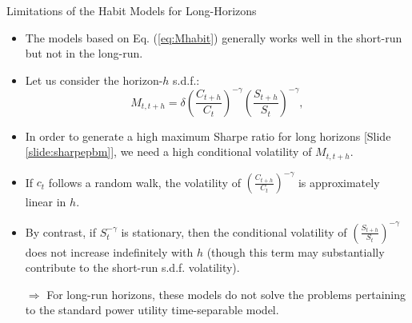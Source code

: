 \begin{frame}{Limitations of the Habit Models for Long-Horizons}
\begin{footnotesize}
\begin{itemize}
	\item The models based on Eq. (\ref{eq:Mhabit}) generally works well in the short-run but not in the long-run.
	\item Let us consider the horizon-$h$ s.d.f.:
	$$
	M_{t,t+h} = \delta \left( \frac{C_{t+h}}{C_t} \right)^{-\gamma}\left( \frac{S_{t+h}}{S_t} \right)^{-\gamma},
	$$
	\item In order to generate a high maximum Sharpe ratio for long horizons [Slide \ref{slide:sharpepbm}], we need a high conditional volatility of $M_{t,t+h}$.
	\item If $c_t$ follows a random walk, the volatility of $\left( \frac{C_{t+h}}{C_t} \right)^{-\gamma}$ is approximately linear in $h$.
	\item By contrast, if $S_t^{-\gamma}$ is stationary, then the conditional volatility of $\left( \frac{S_{t+h}}{S_t} \right)^{-\gamma}$ does not increase indefinitely with $h$ (though this term may substantially contribute to the short-run s.d.f. volatility).
	\item[$\Rightarrow$] For long-run horizons, these models do not solve the problems pertaining to the standard power utility time-separable model.
\end{itemize}
\end{footnotesize}
\end{frame}





